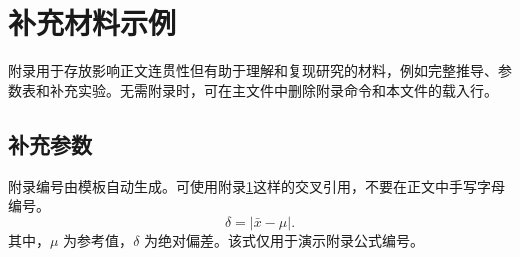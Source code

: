 \chapter{补充材料示例}
\label{app:details}
附录用于存放影响正文连贯性但有助于理解和复现研究的材料，例如完整推导、参数表和补充实验。无需附录时，可在主文件中删除附录命令和本文件的载入行。
\section{补充参数}
附录编号由模板自动生成。可使用附录\ref{app:details}这样的交叉引用，不要在正文中手写字母编号。
\begin{equation}
\delta=\lvert \bar{x}-\mu\rvert .
\label{eq:appendix}
\end{equation}
其中，$\mu$ 为参考值，$\delta$ 为绝对偏差。该式仅用于演示附录公式编号。
